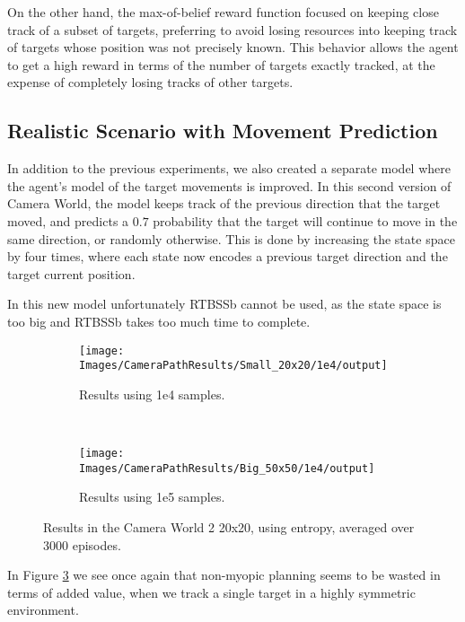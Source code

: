 On the other hand, the max-of-belief reward function focused on keeping close track of a subset of
targets, preferring to avoid losing resources into keeping track of targets whose position was not
precisely known. This behavior allows the agent to get a high reward in terms of the number of
targets exactly tracked, at the expense of completely losing tracks of other targets.

\subsection{Realistic Scenario with Movement Prediction}

In addition to the previous experiments, we also created a separate model where the agent's model of
the target movements is improved. In this second version of Camera World, the model keeps track of
the previous direction that the target moved, and predicts a $0.7$ probability that the target will
continue to move in the same direction, or randomly otherwise. This is done by increasing the state
space by four times, where each state now encodes a previous target direction and the target current
position.

In this new model unfortunately RTBSSb cannot be used, as the state space is too big and RTBSSb
takes too much time to complete.

\begin{figure}[ht!]
        \centering
        \begin{subfigure}[t]{0.45\textwidth}
                \texttt{[image: Images/CameraPathResults/Small\_20x20/1e4/output]}
                \caption{Results using 1e4 samples.}
                \label{fig:cps4e}
        \end{subfigure}%
        ~ %
        \begin{subfigure}[t]{0.45\textwidth}
                \texttt{[image: Images/CameraPathResults/Big\_50x50/1e4/output]}
                \caption{Results using 1e5 samples.}
                \label{fig:cps5e}
        \end{subfigure}
        \caption{Results in the Camera World 2 20x20, using entropy, averaged over 3000 episodes.}
        \label{fig:cpse}
\end{figure}

In Figure \ref{fig:cpse} we see once again that non-myopic planning seems to be wasted in terms of
added value, when we track a single target in a highly symmetric environment.

